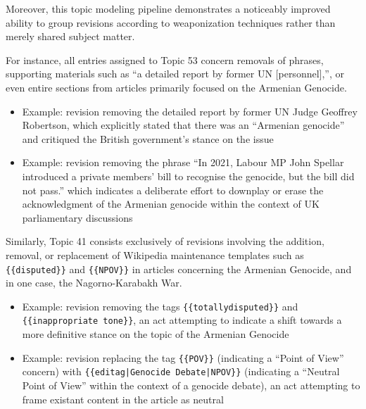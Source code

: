 \documentclass[11pt, a4paper, twoside, openright]{article} %
\begin{document}
Moreover, this topic modeling pipeline demonstrates a noticeably improved ability to group revisions according to weaponization techniques rather than merely shared subject matter.

For instance, all entries assigned to Topic 53 concern removals of phrases, supporting materials such as ``a detailed report by former UN [personnel],'', or even entire sections from articles primarily focused on the Armenian Genocide.
\begin{itemize}
    \item Example: revision removing the detailed report by former UN Judge Geoffrey Robertson, which explicitly stated that there was an ``Armenian genocide'' and critiqued the British government's stance on the issue
    \item Example: revision removing the phrase ``In 2021, Labour MP John Spellar introduced a private members' bill to recognise the genocide, but the bill did not pass.'' which indicates a deliberate effort to downplay or erase the acknowledgment of the Armenian genocide within the context of UK parliamentary discussions
\end{itemize}

Similarly, Topic 41 consists exclusively of revisions involving the addition, removal, or replacement of Wikipedia maintenance templates such as \texttt{\{\{disputed\}\}} and \texttt{\{\{NPOV\}\}} in articles concerning the Armenian Genocide, and in one case, the Nagorno-Karabakh War.
\begin{itemize}
    \item Example: revision removing the tags \texttt{\{\{totallydisputed\}\}} and \texttt{\{\{inappropriate tone\}\}}, an act attempting to indicate a shift towards a more definitive stance on the topic of the Armenian Genocide
    \item Example: revision replacing the tag \texttt{\{\{POV\}\}} (indicating a ``Point of View'' concern) with \texttt{\{\{editag|Genocide Debate|NPOV\}\}} (indicating a ``Neutral Point of View'' within the context of a genocide debate), an act attempting to frame existant content in the article as neutral
\end{itemize}
\end{document}
